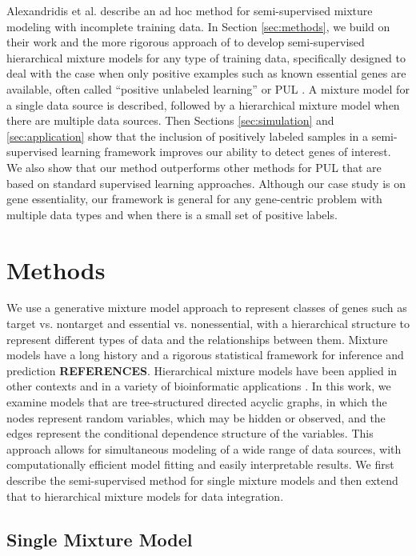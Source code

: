 \documentclass{bmcart}
\begin{document}
Alexandridis et al. \citep{Alexandridis2004a} describe an ad hoc method for semi-supervised mixture modeling with incomplete training data.  In Section \ref{sec:methods}, we build on their work and the more rigorous approach of \citep{Elkan2008a} to develop semi-supervised hierarchical mixture models for any type of training data, specifically designed to deal with the case when only positive examples such as known essential genes are available, often called ``positive unlabeled learning'' or PUL \citep{He2010a}.  A mixture model for a single data source is described, followed by a hierarchical mixture model when there are multiple data sources. Then Sections \ref{sec:simulation} and \ref{sec:application} show that the inclusion of positively labeled samples in a semi-supervised learning framework improves our ability to detect genes of interest.  We also show that our method outperforms other methods for PUL that are based on standard supervised learning approaches. Although our case study is on gene essentiality, our framework is general for any gene-centric problem with multiple data types and when there is a small set of positive labels.

\section*{Methods}
\label{sec:methods}
We use a generative mixture model approach to represent classes of genes such as target vs. nontarget and essential vs. nonessential, with a hierarchical structure to represent different types of data and the relationships between them.  Mixture models have a long history and a rigorous statistical framework for inference and prediction \textbf{REFERENCES}. Hierarchical mixture models have been applied in other contexts \citep{Vermunt2005a} and in a variety of bioinformatic applications \citep{Jornsten2008a, Li2010a}. In this work, we examine models that are tree-structured directed acyclic graphs, in which the nodes represent random variables, which may be hidden or observed, and the edges represent the conditional dependence structure of the variables. This approach allows for simultaneous modeling of a wide range of data sources, with computationally efficient model fitting and easily interpretable results. We first describe the semi-supervised method for single mixture models and then extend that to hierarchical mixture models for data integration.

\subsection*{Single Mixture Model}
\label{subsec:methods.unsup.marginal}
\end{document}

